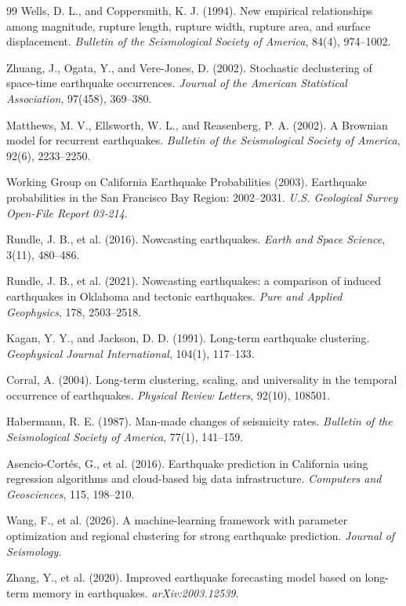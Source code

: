 \documentclass[11pt,a4paper]{article}
\begin{document}
\begin{thebibliography}{99}
 Wells, D. L., and Coppersmith, K. J. (1994). New
empirical relationships among magnitude, rupture length, rupture width,
rupture area, and surface displacement. \emph{Bulletin of the Seismological
Society of America}, 84(4), 974--1002.

 Zhuang, J., Ogata, Y., and Vere-Jones, D. (2002).
Stochastic declustering of space-time earthquake occurrences. \emph{Journal
of the American Statistical Association}, 97(458), 369--380.

 Matthews, M. V., Ellsworth, W. L., and Reasenberg,
P. A. (2002). A Brownian model for recurrent earthquakes. \emph{Bulletin of
the Seismological Society of America}, 92(6), 2233--2250.

 Working Group on California Earthquake Probabilities
(2003). Earthquake probabilities in the San Francisco Bay Region:
2002--2031. \emph{U.S. Geological Survey Open-File Report 03-214}.

 Rundle, J. B., et al. (2016). Nowcasting earthquakes.
\emph{Earth and Space Science}, 3(11), 480--486.

 Rundle, J. B., et al. (2021). Nowcasting earthquakes: a
comparison of induced earthquakes in Oklahoma and tectonic earthquakes.
\emph{Pure and Applied Geophysics}, 178, 2503--2518.

 Kagan, Y. Y., and Jackson, D. D. (1991). Long-term
earthquake clustering. \emph{Geophysical Journal International}, 104(1),
117--133.

 Corral, A. (2004). Long-term clustering, scaling, and
universality in the temporal occurrence of earthquakes. \emph{Physical Review
Letters}, 92(10), 108501.

 Habermann, R. E. (1987). Man-made changes of
seismicity rates. \emph{Bulletin of the Seismological Society of America},
77(1), 141--159.

 Asencio-Cort\'es, G., et al. (2016). Earthquake
prediction in California using regression algorithms and cloud-based big
data infrastructure. \emph{Computers and Geosciences}, 115, 198--210.

 Wang, F., et al. (2026). A machine-learning framework with
parameter optimization and regional clustering for strong earthquake
prediction. \emph{Journal of Seismology}.

 Zhang, Y., et al. (2020). Improved earthquake forecasting
model based on long-term memory in earthquakes. \emph{arXiv:2003.12539}.


\end{thebibliography}
\end{document}
